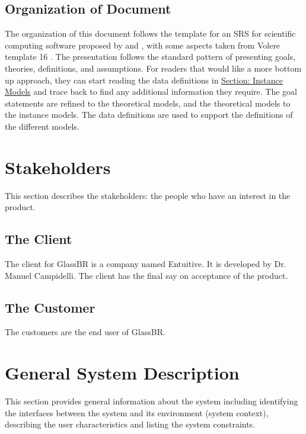 \documentclass[12pt]{article}
\begin{document}
\subsection{Organization of Document}
\label{Sec:DocOrg}
The organization of this document follows the template for an SRS for scientific computing software proposed by \cite{koothoor2013} and \cite{smithLai2005}, with some aspects taken from Volere template 16 \cite{rbrtsn2012}. The presentation follows the standard pattern of presenting goals, theories, definitions, and assumptions. For readers that would like a more bottom up approach, they can start reading the data definitions in \hyperref[Sec:IMs]{Section: Instance Models} and trace back to find any additional information they require.
The goal statements are refined to the theoretical models, and the theoretical models to the instance models. The data definitions are used to support the definitions of the different models.
\section{Stakeholders}
\label{Sec:Stakeholder}
This section describes the stakeholders: the people who have an interest in the product.
\subsection{The Client}
\label{Sec:Client}
The client for GlassBR is a company named Entuitive. It is developed by Dr. Manuel Campidelli. The client has the final say on acceptance of the product.
\subsection{The Customer}
\label{Sec:Customer}
The customers are the end user of GlassBR.
\section{General System Description}
\label{Sec:GenSysDesc}
This section provides general information about the system including identifying the interfaces between the system and its environment (system context), describing the user characteristics and listing the system constraints.
\end{document}
